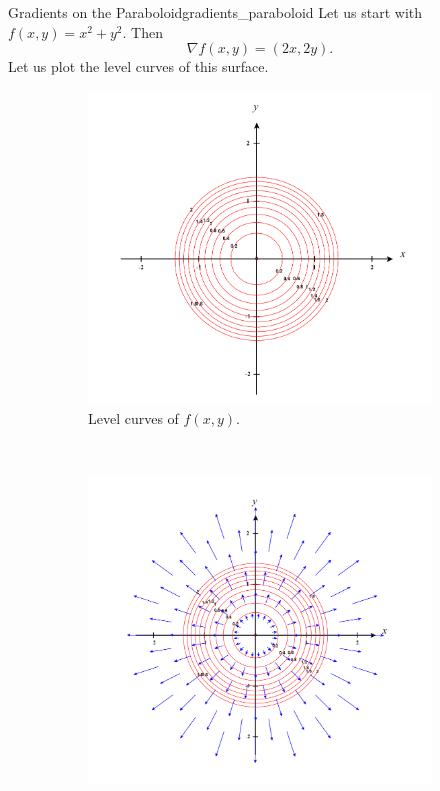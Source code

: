                         \begin{ex}{Gradients on the Paraboloid}{gradients_paraboloid}
                        Let us start with $f(x,y)=x^2+y^2$.  Then
                        \[
                        \nabla f(x,y) = (2x,2y).
                        \]
                        Let us plot the level curves of this surface.
                        \begin{figure}[H]
                            \centering
                            \begin{subfigure}[h]{.45\textwidth}
                            \includegraphics[width=\textwidth]{Figures_Part_6/level_curves_gradient.png}
                            \caption{Level curves of $f(x,y)$.}
                            \end{subfigure}
                            ~
                            \begin{subfigure}[h]{.45\textwidth}
                            \includegraphics[width=\textwidth]{Figures_Part_6/level_curves_gradient_vectors.png}

\end{subfigure}
\end{figure}
\end{ex}
